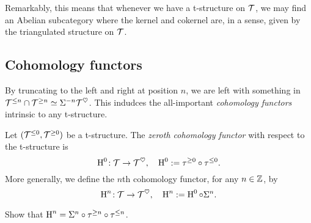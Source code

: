 Remarkably, this means that whenever we have a t-structure on \(\mathcal{T}\), we may find an Abelian subcategory where the kernel and cokernel are, in a sense, given by the
triangulated structure on \(\mathcal{T}\).

\subsection{Cohomology functors}
By truncating to the left and right at position \(n\), we are left with something in \(\mathcal{T}^{\leq n}\cap\mathcal{T}^{\geq n} \simeq \Sigma^{-n}\mathcal{T}^\heartsuit\). This
indudces the all-important \emph{cohomology functors} intrinsic to any t-structure.
\begin{definition}
	Let \((\mathcal{T}^{\leq0},\mathcal{T}^{\geq0})\) be a t-structure. The \emph{zeroth cohomology functor} with respect to the t-structure is
	\[ \operatorname{H}^0\!:\mathcal{T}\to\mathcal{T}^\heartsuit,\quad \operatorname{H}^0 := \tau^{\geq 0}\circ\tau^{\leq 0}. \]
	More generally, we define the \(n\)th cohomology functor, for any \(n\in\mathbb{Z}\), by
	\[ \operatorname{H}^n\!:\mathcal{T}\to\mathcal{T}^\heartsuit,\quad \operatorname{H}^n := \operatorname{H}^0\circ\Sigma^n. \]
\end{definition}
\begin{exercise}
	Show that \(\operatorname{H}^n = \Sigma^n\circ \tau^{\geq n}\circ\tau^{\leq n}\).
\end{exercise}

